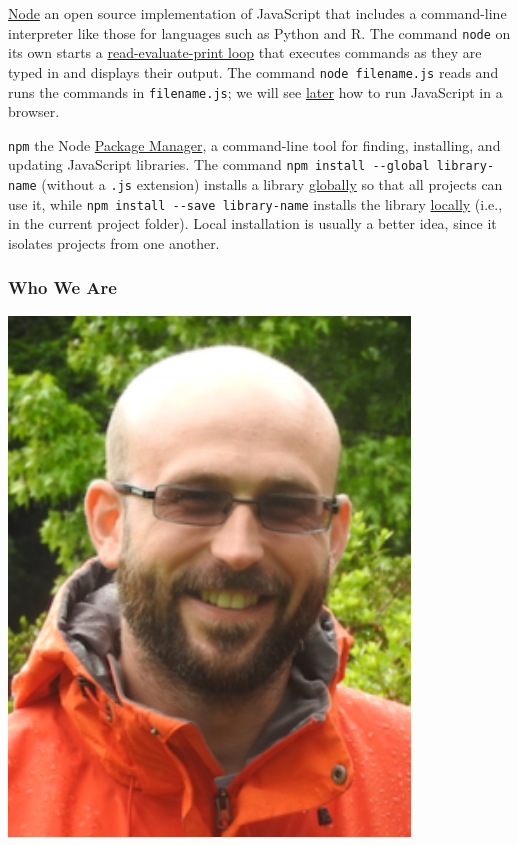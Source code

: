 \protect\hyperlink{g:node-js}{Node} an open source implementation of
JavaScript that includes a command-line interpreter like those for
languages such as Python and R. The command \texttt{node} on its own
starts a \protect\hyperlink{g:repl}{read-evaluate-print loop} that
executes commands as they are typed in and displays their output. The
command \texttt{node\ filename.js} reads and runs the commands in
\texttt{filename.js}; we will see \protect\hyperlink{s:pages}{later} how
to run JavaScript in a browser.

\texttt{npm} the Node \protect\hyperlink{g:package-manager}{Package
Manager}, a command-line tool for finding, installing, and updating
JavaScript libraries. The command
\texttt{npm\ install\ -\/-global\ library-name} (without a \texttt{.js}
extension) installs a library
\protect\hyperlink{g:global-installation}{globally} so that all projects
can use it, while \texttt{npm\ install\ -\/-save\ library-name} installs
the library \protect\hyperlink{g:local-installation}{locally} (i.e., in
the current project folder). Local installation is usually a better
idea, since it isolates projects from one another.

\subsubsection{Who We Are}\label{s:intro-contributors}

\includegraphics[width=0.80000\textwidth]{../../files/toby-hodges.png}

